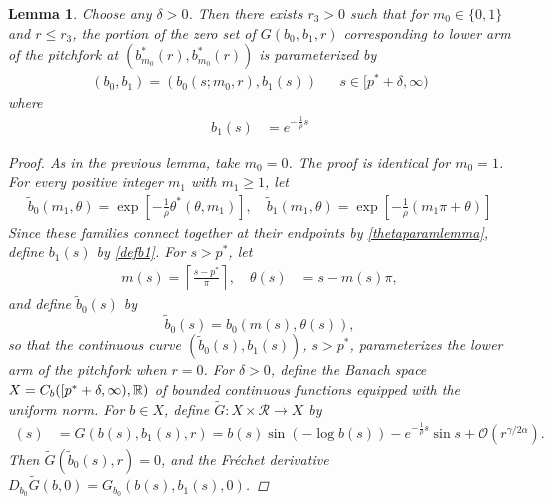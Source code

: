 \documentclass[10pt,reqno]{amsart}
\theoremstyle{plain}
\newtheorem{lemma}[theorem]{Lemma}
\theoremstyle{definition}
\theoremstyle{remark}
\numberwithin{theorem}{section}
\numberwithin{equation}{section}
\begin{document}
\begin{lemma}\label{armpersists}
Choose any $\delta > 0$. Then there exists $r_3 > 0$ such that for $m_0 \in \{0, 1\}$ and $r \leq r_3$, the portion of the zero set of $G(b_0, b_1, r)$ corresponding to lower arm of the pitchfork at $(b_{m_0}^*(r), b_{m_0}^*(r))$ is parameterized by
\begin{align*}
(b_0, b_1) = (b_0(s; m_0, r), b_1(s)) && s \in [p^* + \delta, \infty)
\end{align*}
where
\begin{align}\label{defb1}
b_1(s) &= e^{-\frac{1}{\rho}s} 
\end{align}

\begin{proof}
As in the previous lemma, take $m_0 = 0$. The proof is identical for $m_0 = 1$. For every positive integer $m_1$ with $m_1 \geq 1$, let
\begin{equation}\label{thetaparam2}
\begin{aligned}
\tilde{b}_0( m_1, \theta) = \exp\left[ -\frac{1}{\rho}\theta^*(\theta, m_1) \right], \quad
\tilde{b}_1( m_1, \theta) = \exp\left[ -\frac{1}{\rho}(m_1 \pi + \theta) \right]
\end{aligned}
\end{equation}
Since these families connect together at their endpoints by \cref{thetaparamlemma}, define $b_1(s)$ by \cref{defb1}. For $s > p^*$, let
\begin{equation}\label{defmsthetas}
\begin{aligned}
m(s) = \left\lceil \frac{s - p^*}{\pi} \right\rceil, \quad
\theta(s) &= s - m(s) \pi,
\end{aligned}
\end{equation}
and define $\tilde{b}_0(s)$ by
\begin{equation}\label{defb0}
\tilde{b}_0(s) = b_0(m(s), \theta(s)),
\end{equation}
so that the continuous curve $(\tilde{b}_0(s), b_1(s))$, $s > p^*$, parameterizes the lower arm of the pitchfork when $r = 0$. For $\delta > 0$, define the Banach space $X = C_b([p^* + \delta, \infty), \mathbb{R})$ of bounded continuous functions equipped with the uniform norm. For $b \in X$, define $\tilde{G}: X \times \mathcal{R} \rightarrow X$ by
\begin{align*}
[\tilde{G}(b, r)](s) &= G(b(s), b_1(s), r) = b(s) \sin(-\log b(s) ) - e^{-\frac{1}{\rho}s} \sin s + \mathcal{O}(r^{\gamma/2\alpha}).
\end{align*}
Then $\tilde{G}(\tilde{b}_0(s), r) = 0$, and the Fr\'echet derivative $D_{b_0} \tilde{G}(b, 0) = G_{b_0}(b(s), b_1(s), 0)$.


\end{proof}
\end{lemma}
\end{document}
